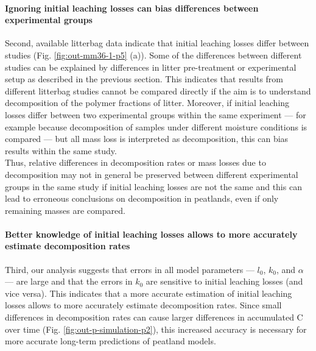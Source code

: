 \documentclass[bg, manuscript]{copernicus}
\begin{document}
\paragraph*{Ignoring initial leaching losses can bias differences between experimental groups}

Second, available litterbag data indicate that initial leaching losses differ between studies (Fig. \ref{fig:out-mm36-1-p5} (a)). Some of the differences between different studies can be explained by differences in litter pre-treatment or experimental setup as described in the previous section. This indicates that results from different litterbag studies cannot be compared directly if the aim is to understand decomposition of the polymer fractions of litter. Moreover, if initial leaching losses differ between two experimental groups within the same experiment --- for example because decomposition of samples under different moisture conditions is compared \citep{Lind.2022} --- but all mass loss is interpreted as decomposition, this can bias results within the same study.\\
Thus, relative differences in decomposition rates or mass losses due to decomposition may not in general be preserved between different experimental groups in the same study if initial leaching losses are not the same and this can lead to erroneous conclusions on decomposition in peatlands, even if only remaining masses are compared.

\paragraph*{Better knowledge of initial leaching losses allows to more accurately estimate decomposition rates}

Third, our analysis suggests that errors in all model parameters --- \(l_0\), \(k_0\), and \(\alpha\) --- are large and that the errors in \(k_0\) are sensitive to initial leaching losses (and vice versa). This indicates that a more accurate estimation of initial leaching losses allows to more accurately estimate decomposition rates. Since small differences in decomposition rates can cause larger differences in accumulated C over time (Fig. \ref{fig:out-p-simulation-p2}), this increased accuracy is necessary for more accurate long-term predictions of peatland models.
\end{document}
